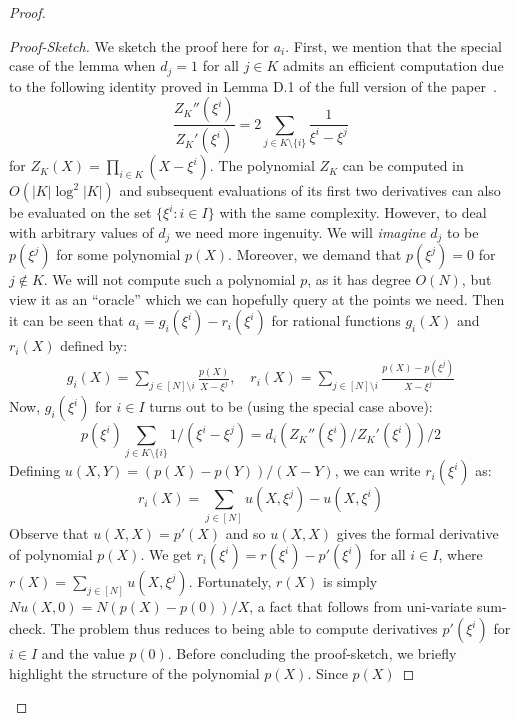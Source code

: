 \begin{proof}
\begin{lemma}
    \end{lemma}
    \begin{proof}[Proof-Sketch]
        We sketch the proof here for $a_i$.
        First, we mention that the special case of the lemma when $d_j=1$ for all $j\in K$ admits an efficient computation due to the following identity
        proved in Lemma D.1 of the full version of the paper~\cite{full-ver}.
        \begin{equation*}
            \frac{Z_K''(\xi^i)}{Z_K'(\xi^i)} = 2\sum_{j\in K\setminus \{i\}}\frac{1}{\xi^i-\xi^j}
        \end{equation*}
        for $Z_K(X)=\prod_{i\in K}(X-\xi^i)$. The polynomial $Z_K$ can be computed in $O(|K|\log^2|K|)$ and subsequent evaluations of its first two
        derivatives can also be evaluated on the set $\{\xi^i: i\in I\}$ with the same complexity. However, to deal with arbitrary values of $d_j$ we
        need more ingenuity. We will {\em imagine} $d_j$ to be $p(\xi^j)$ for some polynomial $p(X)$. Moreover, we demand that $p(\xi^j)=0$ for $j\not\in K$.
        We will not compute such a polynomial $p$, as it has degree $O(N)$, but view it as an ``oracle'' which we can hopefully query at the points we need.
        Then it can be seen that $a_i=g_i(\xi^i) - r_i(\xi^i)$ for rational functions $g_i(X)$ and $r_i(X)$ defined by:
        \begin{align}\label{eq:rat-fun-f}
        g_i(X) =\sum_{j\in [N]\setminus i}\frac{p(X)}{X-\xi^j},\quad
        r_i(X) =\sum_{j\in [N]\setminus i} \frac{p(X)-p(\xi^j)}{X-\xi^j}
        \end{align}
        Now, $g_i(\xi^i)$ for $i\in I$ turns out to be (using the special case above):
        $$p(\xi^i)\sum_{j\in K\setminus \{i\}} 1/(\xi^i-\xi^j)=d_i(Z_K''(\xi^i)/Z_K'(\xi^i))/2$$
        Defining $u(X,Y)=(p(X)-p(Y))/(X-Y)$, we can write $r_i(\xi^i)$ as:
        \begin{equation}
            r_i(X) = \sum_{j\in [N]}u(X,\xi^j) - u(X,\xi^i)
        \end{equation}
        Observe that $u(X,X)=p'(X)$ and so $u(X,X)$ gives the formal derivative of polynomial $p(X)$. We get
        $r_i(\xi^i)=r(\xi^i)-p'(\xi^i)$ for all $i\in I$, where $r(X)=\sum_{j\in [N]}u(X,\xi^j)$. Fortunately,
        $r(X)$ is simply $Nu(X,0)=N(p(X) - p(0))/X$, a fact that follows from uni-variate sum-check. The problem
        thus reduces to being able to compute derivatives $p'(\xi^i)$ for $i\in I$ and the value $p(0)$. Before
        concluding the proof-sketch, we briefly highlight the structure of the polynomial $p(X)$. Since $p(X)$

\end{proof}
\end{proof}
